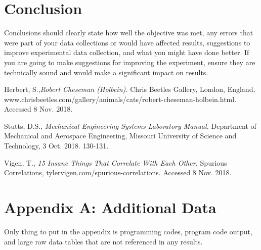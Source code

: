 \documentclass[11pt,a4paper]{article}
\begin{document}
\section*{Conclusion}
Conclusions should clearly state how well the objective was met, any errors that were part of your data collections or would have affected results, suggestions to improve experimental data collection, and what you might have done better. If you are going to make suggestions for improving the experiment, ensure they are technically sound and would make a significant impact on results.

\begin{thebibliography}{3} %

  Herbert, S.,\emph{Robert Cheseman (Holbein).}
  Chris Beetles Gallery, London, England, www.chrisbeetles.com/gallery/animals/cats/robert-cheseman-holbein.html. Accessed 8 Nov. 2018.
  
  Stutts, D.S., \emph{Mechanical Engineering Systems Laboratory Manual.}
  Department of Mechanical and Aerospace Engineering, Missouri University of Science and Technology, 3 Oct. 2018. 130-131.
  
  Vigen, T., \emph{15 Insane Things That Correlate With Each Other.}
  Spurious Correlations, tylervigen.com/spurious-correlations. Accessed 8 Nov. 2018.

\end{thebibliography}

\newpage %
\section*{Appendix A: Additional Data}
Only thing to put in the appendix is programming codes, program code output, and large raw data tables that are not referenced in any results.
\end{document}
